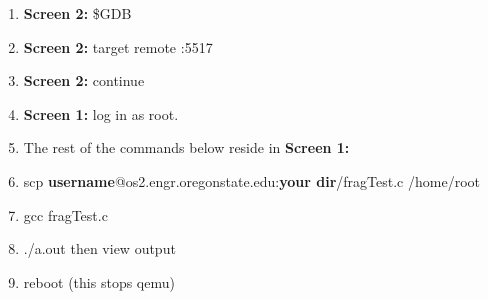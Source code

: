 \documentclass[draftclsnofoot, onecolumn, 10pt, compsoc]{IEEEtran}
\begin{document}
\begin{enumerate}
\begin{enumerate}
					\item \textbf{Screen 2:} \$GDB
					
					\item \textbf{Screen 2:} target remote :5517
					
					\item \textbf{Screen 2:} continue
					
					\item \textbf{Screen 1:} log in as root.
					
					\item The rest of the commands below reside in \textbf{Screen 1:}
					
					\item{scp \textbf{username}@os2.engr.oregonstate.edu:\textbf{your dir}/fragTest.c /home/root}
					
					\item{gcc fragTest.c}
					\item{./a.out then view output}
					
					\item reboot (this stops qemu)
				\end{enumerate}
			\end{enumerate}
\end{document}
